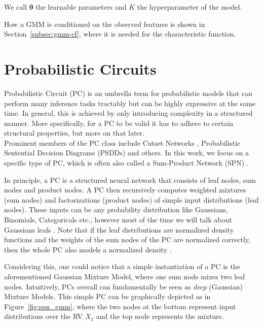 We call $\boldsymbol{\theta}$ the learnable parameters and $K$ the hyperparameter of the model.

How a GMM is conditioned on the observed features is shown in
Section~\ref{subsec:gmm-cf}, where it is needed for the characteristic function.

\section{Probabilistic Circuits}
\label{sec:pc}

Probabilistic Circuit (PC) \cite{pc_intro} is an umbrella term for probabilistic models that can perform many inference tasks tractably but can be 
highly expressive at the same time. In general, this is achieved by only introducing complexity in a structured manner. More specifically,
for a PC to be valid it has to adhere to certain structural properties, but more on that later. \\

Prominent members of the PC class include Cutset Networks \cite{cutset}, Probabilistic
Sentential Decision Diagrams (PSDDs) \cite{psdd} and others. In this work, we focus on a specific type of PC, which is often also called a Sum-Product Network (SPN) \cite{spn}.

In principle, a PC is a structured neural network that consists of leaf nodes, sum nodes and product 
nodes. A PC then recursively computes weighted mixtures (sum nodes) and factorizations (product nodes) of simple input distributions (leaf nodes). 
These inputs can be any probability distribution like Gaussians, Binomials, Categoricals etc.,
however most of the time we will talk about Gaussians leafs \cite{pc_intro}. Note that if the leaf distributions are normalized density functions and the weights of the sum nodes of the PC are
normalized correctly, then the whole PC also models a normalized density \cite{pc_intro}.

Considering this, one could notice that a simple instantiation of a PC is the aforementioned
Gaussian Mixture Model, where one sum node mixes two leaf nodes. Intuitively, PCs overall can fundamentally be seen as \emph{deep} (Gaussian) Mixture Models. 
This simple PC can be graphically depicted as in Figure~\ref{fig:spn_gmm}, where the two nodes at the bottom represent input distributions over the RV $X_1$ and the top node
represents the mixture.

